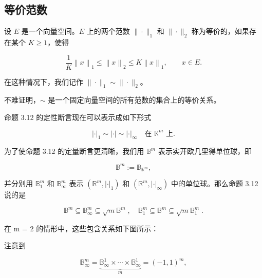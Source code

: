 \subsection*{等价范数}

设 $E$ 是一个向量空间。$E$ 上的两个范数 $\|\cdot\|_1$ 和 $\|\cdot\|_2$ 称为等价的，如果存在某个 $K \geq 1$，使得

\begin{equation}
\frac{1}{K}\left\|x\right\|_{1}\leq\left\|x\right\|_{2}\leq K\left\|x\right\|_{1},\qquad x\in E.
\end{equation}

在这种情况下，我们记作 $ \|\cdot\|_1 \sim \|\cdot\|_2 $。

\begin{remark}

\begin{items}
\item

不难证明，$ \sim $ 是一个固定向量空间的所有范数的集合上的等价关系。

\item

命题 3.12 的定性断言现在可以表示成如下形式

\[
|\cdot|_{1}\sim|\cdot|\sim|\cdot|_{\infty}\quad\text{在 }{\mathbb{K}}^{m}\text{ 上}.
\]
\item

为了使命题 3.12 的定量断言更清晰，我们用 $ \mathbb{B}^{m} $ 表示实开欧几里得单位球，即

\[
\mathbb{B}^{m}:=\mathbb{B}_{\mathbb{R}^{m}},
\]

并分别用 $ \mathbb{B}_1^m $ 和 $ \mathbb{B}_\infty^m $ 表示 $ (\mathbb{R}^m, |\cdot|_1) $ 和 $ (\mathbb{R}^m, |\cdot|_{\infty}) $ 中的单位球。那么命题 3.12 说的是

\[
\mathbb{B}^{m}\subseteq\mathbb{B}_{\infty}^{m}\subseteq\sqrt{m}\mathbb{B}^{m}\;,\quad\mathbb{B}_{1}^{m}\subseteq\mathbb{B}^{m}\subseteq\sqrt{m}\mathbb{B}_{1}^{m}\;.
\]

在 m = 2 的情形中，这些包含关系如下图所示：

\end{items}


注意到

\begin{equation}
\mathbb{B}_{\infty}^{m}=\underbrace{\mathbb{B}_{\infty}^{1}\times\cdots\times\mathbb{B}_{\infty}^{1}}_{m}=(-1,1)^{m},
\end{equation}


\end{remark}

